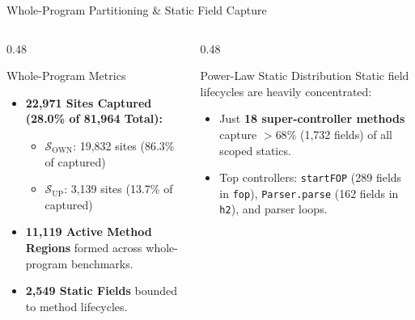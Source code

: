 \documentclass[11pt]{beamer}
\begin{document}
\begin{frame}{Whole-Program Partitioning \& Static Field Capture}
  \begin{columns}[T]
    \begin{column}{0.48\textwidth}
      \begin{block}{Whole-Program Metrics}
        \begin{itemize}
          \item \textbf{22,971 Sites Captured (28.0\% of 81,964 Total):}
            \begin{itemize}
              \item $\mathcal{S}_{\text{OWN}}$: 19,832 sites (86.3\% of captured)
              \item $\mathcal{S}_{\text{UP}}$: 3,139 sites (13.7\% of captured)
            \end{itemize}
          \item \textbf{11,119 Active Method Regions} formed across whole-program benchmarks.
          \item \textbf{2,549 Static Fields} bounded to method lifecycles.
        \end{itemize}
      \end{block}
    \end{column}
    \begin{column}{0.48\textwidth}
      \begin{alertblock}{Power-Law Static Distribution}
        Static field lifecycles are heavily concentrated:
        \begin{itemize}
          \item Just \textbf{18 super-controller methods} capture $>68\%$ (1,732 fields) of all scoped statics.
          \item Top controllers: \texttt{startFOP} (289 fields in \texttt{fop}), \texttt{Parser.parse} (162 fields in \texttt{h2}), and parser loops.
        \end{itemize}
      \end{alertblock}
    \end{column}
  \end{columns}
\end{frame}
\end{document}
